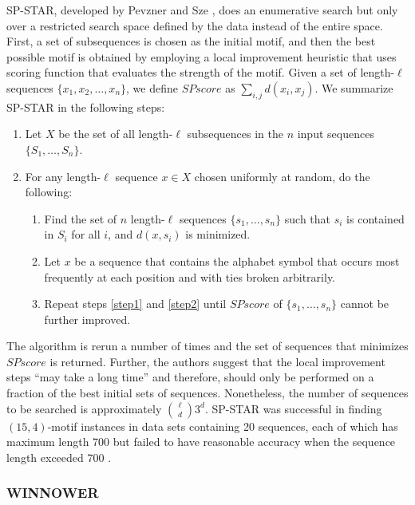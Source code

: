 SP-STAR, developed by Pevzner and Sze \cite{PS00}, does an enumerative search but only over a restricted search space defined by the data instead of the entire space. First, a set of subsequences is chosen as the initial motif, and then the best possible motif is obtained by employing a local improvement heuristic that uses scoring function that evaluates the strength of the motif. Given a set of length-$\ell$ sequences $\{x_1, x_2, \ldots, x_n\}$, we define $SPscore$ as $\sum_{i, j} d(x_i, x_j)$.   We summarize SP-STAR in the following steps:
\begin{enumerate}
\item Let $X$ be the set of all length-$\ell$ subsequences in the $n$ input sequences $\{S_1, \ldots, S_n\}$.
\item For any length-$\ell$ sequence $x \in X$ chosen uniformly at random, do the following:
\begin{enumerate}
\item\label{step1} Find the set of $n$ length-$\ell$ sequences $\{s_1, \ldots, s_n\}$ such that $s_i$ is contained in $S_i$ for all $i$, and $d(x, s_i)$ is minimized. 
\item\label{step2} Let $x$ be a sequence that contains the alphabet symbol that occurs most frequently at each position and with ties broken arbitrarily. 
\item Repeat steps \ref{step1} and \ref{step2} until $SPscore$ of $\{s_1, \ldots, s_n\}$ cannot be further improved. 
\end{enumerate}
\end{enumerate}

The algorithm is rerun a number of times and the set of sequences that minimizes $SPscore$ is returned.  Further, the authors suggest that the local improvement steps ``may take a long time'' \cite{PS00} and therefore, should only be performed on a fraction of the best initial sets of sequences. Nonetheless, the number of sequences to be searched is approximately ${\ell \choose d} 3^d$. SP-STAR was successful in finding $(15,4)$-motif instances in data sets containing 20 sequences, each of which has maximum length 700 but failed to have reasonable accuracy when the sequence length exceeded 700 \cite{RBH05}. 

\subsubsection{WINNOWER}

